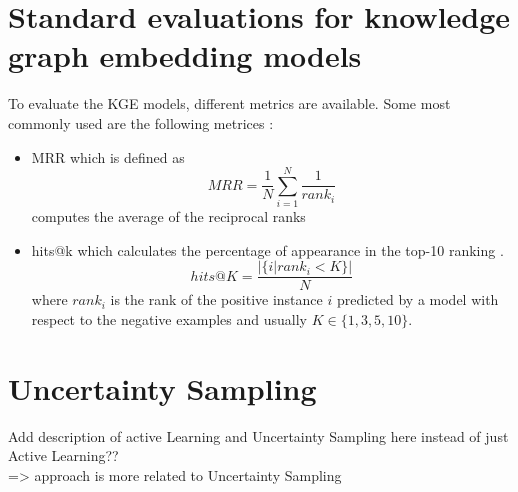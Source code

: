 \section{Standard evaluations for knowledge graph embedding models} 

To evaluate the \ac{KGE} models, different metrics are available.
Some most commonly used are the following metrices \cite{kotnis2017analysis}:
\begin{itemize}
    \item 
    \ac{MRR} which is defined as
    $$MRR = \frac{1}{N} \sum_{i=1}^{N}\frac{1}{rank_i}$$
    computes the average of the reciprocal ranks \cite{zhang2021efficient}
    
    \item 
    hits@k which calculates the percentage of appearance in the top-10 ranking \cite{zhang2021efficient}.
    $$hits@K = \frac{|\{i | rank_i < K\}|}{N}$$
    where $rank_i$ is the rank of the positive instance $i$ predicted by a model with respect to the negative examples and usually $K \in \{1, 3, 5, 10\}$.
 
\end{itemize}


\section{Uncertainty Sampling}

Add description of active Learning and Uncertainty Sampling here instead of just Active Learning??\\
=> approach is more related to Uncertainty Sampling

